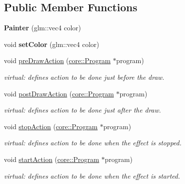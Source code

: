 \subsection*{Public Member Functions}
\begin{DoxyCompactItemize}
\item 
\hypertarget{classfillwave_1_1effects_1_1Painter_a1cecc1b13856e85707042c08c3be55a6}{}{\bfseries Painter} (glm\+::vec4 color)\label{classfillwave_1_1effects_1_1Painter_a1cecc1b13856e85707042c08c3be55a6}

\item 
\hypertarget{classfillwave_1_1effects_1_1Painter_ad95c1adcbb62029665a26badc5f07b79}{}void {\bfseries set\+Color} (glm\+::vec4 color)\label{classfillwave_1_1effects_1_1Painter_ad95c1adcbb62029665a26badc5f07b79}

\item 
void \hyperlink{classfillwave_1_1effects_1_1Painter_a20bc2a09533498222c132e799c2c6080}{pre\+Draw\+Action} (\hyperlink{classfillwave_1_1core_1_1Program}{core\+::\+Program} $\ast$program)
\begin{DoxyCompactList}\small\item\em virtual\+: defines action to be done just before the draw. \end{DoxyCompactList}\item 
void \hyperlink{classfillwave_1_1effects_1_1Painter_a90b22772f264da46b7a2905b25025161}{post\+Draw\+Action} (\hyperlink{classfillwave_1_1core_1_1Program}{core\+::\+Program} $\ast$program)
\begin{DoxyCompactList}\small\item\em virtual\+: defines action to be done just after the draw. \end{DoxyCompactList}\item 
void \hyperlink{classfillwave_1_1effects_1_1Painter_a3180272825b161c45a5090e0b40f2797}{stop\+Action} (\hyperlink{classfillwave_1_1core_1_1Program}{core\+::\+Program} $\ast$program)
\begin{DoxyCompactList}\small\item\em virtual\+: defines action to be done when the effect is stopped. \end{DoxyCompactList}\item 
void \hyperlink{classfillwave_1_1effects_1_1Painter_a100a3bbf344ba7fef60ad9bbcb5fb93c}{start\+Action} (\hyperlink{classfillwave_1_1core_1_1Program}{core\+::\+Program} $\ast$program)
\begin{DoxyCompactList}\small\item\em virtual\+: defines action to be done when the effect is started. \end{DoxyCompactList}\end{DoxyCompactItemize}


